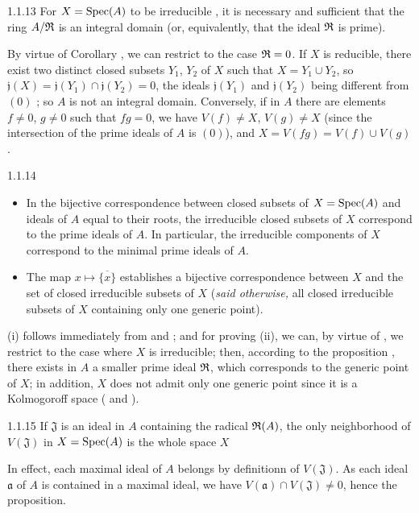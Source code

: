 \begin{env}[Proposition]{1.1.13}
\label{prop-1.1.1.13}
For $X=\operatorname{Spec}(A)$ to be irreducible , it is necessary and sufficient that the ring $A/\mathfrak{R}$
is an integral domain (or, equivalently, that the ideal $\mathfrak{R}$ is prime).
\end{env}

By virtue of Corollary , we can restrict to the case $\mathfrak{R}=0$. If $X$ is reducible,
there exist two distinct closed subsets $Y_1$, $Y_2$ of $X$ such that $X=Y_1\cup Y_2$, so
$\mathfrak{j}(X)=\mathfrak{j}(Y_1)\cap\mathfrak{j}(Y_2)=0$, the ideals $\mathfrak{j}(Y_1)$ and
$\mathfrak{j}(Y_2)$ being different from $(0)$ ; so $A$ is not an integral domain.
Conversely, if in $A$ there are elements $f\neq 0$, $g\neq 0$ such that $fg=0$, we have
$V(f)\neq X$, $V(g)\neq X$ (since the intersection of the prime ideals of $A$ is $(0)$), and
$X=V(fg)=V(f)\cup V(g)$.

\begin{env}[Corollary]{1.1.14}
\label{cor-1.1.1.14}
\begin{itemize}
  \item[(i)] In the bijective correspondence between closed subsets of $X=\operatorname{Spec}(A)$
             and ideals of $A$ equal to their roots, the irreducible closed subsets
             of $X$ correspond to the prime ideals of $A$. In particular, the irreducible
             components of $X$ correspond to the minimal prime ideals of $A$.
  \item[(ii)] The map $x\mapsto\overline{\{x\}}$ establishes a bijective correspondence
              between $X$ and the set of closed irreducible subsets of $X$
              (\emph{said otherwise,} all closed irreducible subsets of $X$ containing
              only one generic point).
\end{itemize}
\end{env}

(i) follows immediately from  and ; and for
proving (ii), we can, by virtue of , we restrict to the case where
$X$ is irreducible; then, according to the proposition , there exists
in $A$ a smaller prime ideal $\mathfrak{R}$, which corresponds to the generic point
of $X$; in addition, $X$ does not admit only one generic point since it is
a Kolmogoroff space ( and ).

\begin{env}[Proposition]{1.1.15}
\label{prop-1.1.1.15}
If $\mathfrak{J}$ is an ideal in $A$ containing the radical $\mathfrak{R}(A)$, the only
neighborhood of $V(\mathfrak{J})$ in $X=\operatorname{Spec}(A)$ is the whole space $X$
\end{env}

In effect, each maximal ideal of $A$ belongs by definitionn of $V(\mathfrak{J})$.
As each ideal $\mathfrak{a}$ of $A$ is contained in a maximal ideal, we have
$V(\mathfrak{a})\cap V(\mathfrak{J})\neq 0$, hence the proposition.

